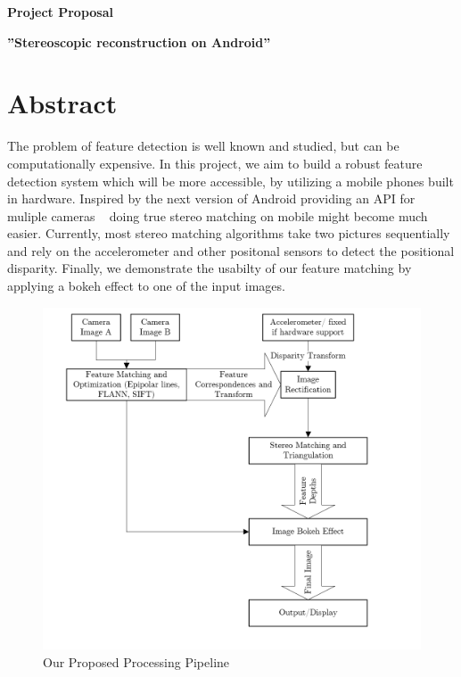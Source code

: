 \documentclass[a4paper,pagesize 10pt]{scrartcl}
\begin{document}
\begin{center}{\Huge\textbf{Project Proposal}}\end{center}
\begin{center}{\Large\textbf{''Stereoscopic reconstruction on Android''}}\end{center}

\section{Abstract}

%
%
%
%
%
The problem of feature detection is well known and studied, but can be computationally expensive. In this project, we aim to build a robust feature detection system which will be more accessible, by utilizing a mobile phones built in hardware. Inspired by the next version of Android providing an API for muliple cameras ~\cite{AndroidPMultiCamera} doing true stereo matching on mobile might become much easier. Currently, most stereo matching algorithms take two pictures sequentially and rely on the accelerometer and other positonal sensors to detect the positional disparity. Finally, we demonstrate the usabilty of our feature matching by applying a bokeh effect to one of the input images.
\begin{figure}[h]
	\centering
	\includegraphics[scale=0.55]{Pipeline.PNG}
	\caption{Our Proposed Processing Pipeline}
\end{figure}
\end{document}
